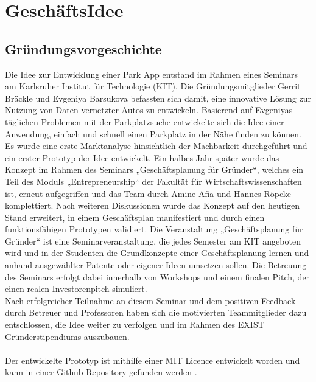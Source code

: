 \documentclass[12pt,ngerman, fleqn]{book} %
\begin{document}

\chapter{GeschäftsIdee}

\section{Gründungsvorgeschichte}

Die Idee zur Entwicklung einer Park App entstand im Rahmen eines Seminars am Karlsruher Institut für Technologie (KIT). Die Gründungsmitglieder Gerrit Bräckle und Evgeniya Barsukova befassten sich damit, eine innovative Lösung zur Nutzung von Daten vernetzter Autos zu entwickeln. Basierend auf Evgeniyas täglichen Problemen mit der Parkplatzsuche entwickelte sich die Idee einer Anwendung, einfach und schnell einen Parkplatz in der Nähe finden zu können. Es wurde eine erste Marktanalyse hinsichtlich der Machbarkeit durchgeführt und ein erster Prototyp der Idee entwickelt. Ein halbes Jahr später wurde das Konzept im Rahmen des Seminars „Geschäftsplanung für Gründer“, welches ein Teil des Moduls „Entrepreneurship“ der Fakultät für Wirtschaftswissenschaften ist, erneut aufgegriffen und das Team durch Amine Afia und Hannes Röpcke komplettiert. Nach weiteren Diskussionen wurde das Konzept auf den heutigen Stand erweitert, in einem Geschäftsplan manifestiert und durch einen funktionsfähigen Prototypen validiert.
Die Veranstaltung „Geschäftsplanung für Gründer“ ist eine Seminarveranstaltung, die jedes Semester am KIT angeboten wird und in der Studenten die Grundkonzepte einer Geschäftsplanung lernen und anhand ausgewählter Patente oder eigener Ideen umsetzen sollen. Die Betreuung des Seminars erfolgt dabei innerhalb von Workshops und einem finalen Pitch, der einen realen Investorenpitch simuliert.\\
Nach erfolgreicher Teilnahme an diesem Seminar und dem positiven Feedback durch Betreuer und Professoren haben sich die motivierten Teammitglieder dazu entschlossen, die Idee weiter zu verfolgen und im Rahmen des EXIST Gründerstipendiums auszubauen.\\ \\
Der entwickelte Prototyp ist mithilfe einer MIT Licence entwickelt worden und kann in einer Github Repository gefunden werden \autocite{github}.
\end{document}
